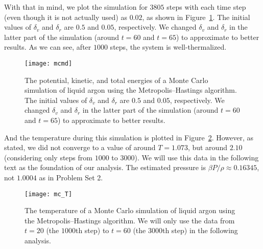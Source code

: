 With that in mind, we plot the simulation for \(3805\) steps with each time step (even
though it is not actually used) as \(0.02\), as shown in Figure~\ref{fig:mcmd}.
The initial values of \(\delta_v\) and \(\delta_r\) are \(0.5\) and \(0.05\),
respectively. We changed \(\delta_v\) and \(\delta_r\) in the latter part of the
simulation (around \(t = 60\) and \(t = 65\)) to approximate to better results.
As we can see, after \(1000\) steps, the system is well-thermalized.
%
\begin{figure}
    \centering
    \texttt{[image: mcmd]}
    \caption{The potential, kinetic, and total energies of a Monte Carlo simulation of
        liquid argon using the Metropolis--Hastings algorithm.
        The initial values of \(\delta_v\) and \(\delta_r\) are \(0.5\) and \(0.05\),
        respectively. We changed \(\delta_v\) and \(\delta_r\) in the latter part of the
        simulation (around \(t = 60\) and \(t = 65\)) to approximate to better results.}
    \label{fig:mcmd}
\end{figure}
%
And the temperature during this simulation is plotted in Figure~\ref{fig:mc_T}.
However, as stated, we did not converge to a value of around \(T = 1.073\), but
around \(2.10\) (considering only steps from \(1000\) to \(3000\)).
We will use this data in the following text as the foundation of our analysis.
The estimated pressure is \(\beta P / \rho \approx 0.16345\), not \(1.0004\)
as in Problem Set 2.

\begin{figure}
    \centering
    \texttt{[image: mc\_T]}
    \caption{The temperature of a Monte Carlo simulation of
        liquid argon using the Metropolis--Hastings algorithm.
        We will only use the data from \(t = 20\) (the \(1000\)th step)
        to \(t = 60\) (the \(3000\)th step) in the following analysis.}
    \label{fig:mc_T}
\end{figure}

